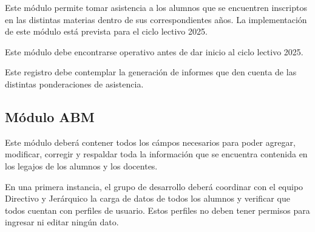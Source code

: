 Este módulo permite tomar asistencia a los alumnos que se encuentren inscriptos en las distintas materias dentro de sus correspondientes años. La implementación de este módulo está prevista para el ciclo lectivo 2025.

Este módulo debe encontrarse operativo antes de dar inicio al ciclo lectivo 2025.

Este registro debe contemplar la generación de informes que den cuenta de las distintas ponderaciones de asistencia.

\subsection{Módulo ABM}

Este módulo deberá contener todos los cámpos necesarios para poder agregar, modificar, corregir y respaldar toda la información que se encuentra contenida en los legajos de los alumnos y los docentes.

En una primera instancia, el grupo de desarrollo deberá coordinar con el equipo Directivo y Jerárquico la carga de datos de todos los alumnos y verificar que todos cuentan con perfiles de usuario. Estos perfiles no deben tener permisos para ingresar ni editar ningún dato.
